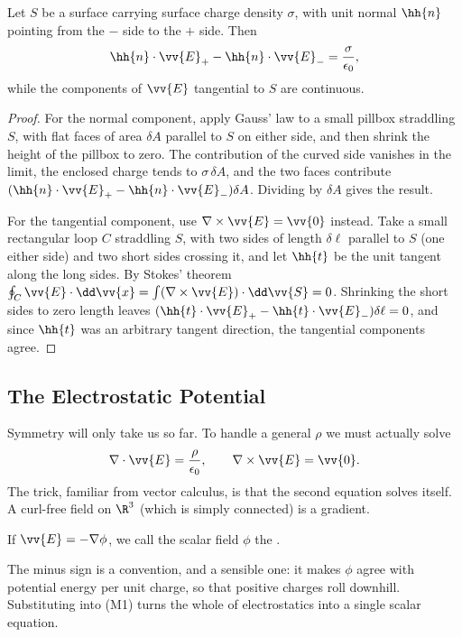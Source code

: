 \begin{proposition}
	\label{prop:jump-E}
	Let $S$ be a surface carrying surface charge density $\sigma$, with unit normal $\hh{n}$ pointing from the $-$ side to the $+$ side. Then
	$$
	\hh{n}\cdot \vv{E}_+ - \hh{n}\cdot\vv{E}_- = \frac{\sigma}{\epsilon_0},
	$$
	while the components of $\vv{E}$ tangential to $S$ are continuous.
\end{proposition}
\begin{proof}
	For the normal component, apply Gauss' law to a small pillbox straddling $S$, with flat faces of area $\delta A$ parallel to $S$ on either side, and then shrink the height of the pillbox to zero. The contribution of the curved side vanishes in the limit, the enclosed charge tends to $\sigma \, \delta A$, and the two faces contribute $(\hh{n}\cdot \vv{E}_+ - \hh{n}\cdot \vv{E}_-)\delta A$. Dividing by $\delta A$ gives the result.

	For the tangential component, use $\nabla \times \vv{E} = \vv{0}$ instead. Take a small rectangular loop $C$ straddling $S$, with two sides of length $\delta \ell$ parallel to $S$ (one either side) and two short sides crossing it, and let $\hh{t}$ be the unit tangent along the long sides. By Stokes' theorem $\oint_C \vv{E}\cdot \dd \vv{x} = \int (\nabla \times \vv{E})\cdot \dd \vv{S} = 0$. Shrinking the short sides to zero length leaves $(\hh{t}\cdot \vv{E}_+ - \hh{t}\cdot \vv{E}_-)\delta \ell = 0$, and since $\hh{t}$ was an arbitrary tangent direction, the tangential components agree.
\end{proof}

\subsection{The Electrostatic Potential}

Symmetry will only take us so far. To handle a general $\rho$ we must actually solve
$$
\nabla \cdot \vv{E} = \frac{\rho}{\epsilon_0}, \qquad \nabla \times \vv{E} = \vv{0}.
$$
The trick, familiar from vector calculus, is that the second equation solves itself. A curl-free field on $\R^3$ (which is simply connected) is a gradient.

\begin{definition}
	If $\vv{E} = -\nabla \phi$, we call the scalar field $\phi$ the .
\end{definition}

The minus sign is a convention, and a sensible one: it makes $\phi$ agree with potential energy per unit charge, so that positive charges roll downhill. Substituting into (M1) turns the whole of electrostatics into a single scalar equation.

